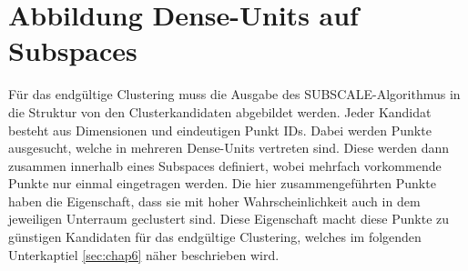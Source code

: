 \section{Abbildung Dense-Units auf Subspaces}\label{sec:chap5}

Für das endgültige Clustering muss die Ausgabe des SUBSCALE-Algorithmus in die Struktur von den
Clusterkandidaten abgebildet werden. Jeder Kandidat besteht aus Dimensionen und eindeutigen Punkt
IDs. Dabei werden Punkte ausgesucht, welche in mehreren Dense-Units vertreten sind. Diese werden
dann zusammen innerhalb eines Subspaces definiert, wobei mehrfach vorkommende Punkte nur einmal
eingetragen werden. Die hier zusammengeführten Punkte haben die Eigenschaft, dass sie mit hoher
Wahrscheinlichkeit auch in dem jeweiligen Unterraum geclustert sind. Diese Eigenschaft macht diese
Punkte zu günstigen Kandidaten für das endgültige Clustering, welches im folgenden Unterkaptiel
\ref{sec:chap6} näher beschrieben wird.
